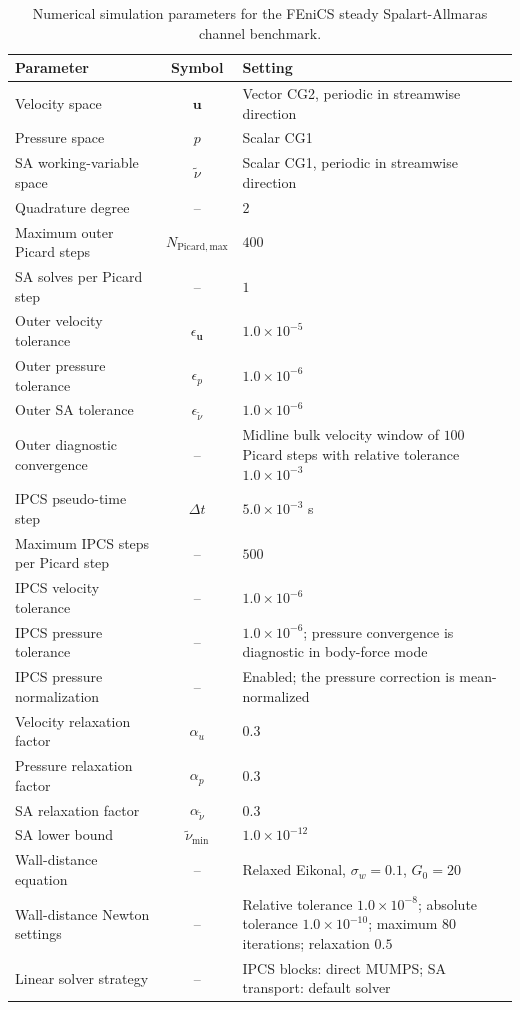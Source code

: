 \begin{table}[htbp]
	\centering
	\scriptsize
	\caption{Numerical simulation parameters for the FEniCS steady Spalart-Allmaras channel benchmark.}
	\label{tab:app_A_channel_numerical}
	\renewcommand{\arraystretch}{1.2}
	\begin{tabularx}{\textwidth}{l c X}
		\hline
		\textbf{Parameter} & \textbf{Symbol} & \textbf{Setting} \\
		\hline
		Velocity space & $\mathbf{u}$ & Vector CG2, periodic in streamwise direction \\
		Pressure space & $p$ & Scalar CG1 \\
		SA working-variable space & $\tilde{\nu}$ & Scalar CG1, periodic in streamwise direction \\
		Quadrature degree & -- & $2$ \\
			Maximum outer Picard steps & $N_{\mathrm{Picard,max}}$ & $400$ \\
			SA solves per Picard step & -- & $1$ \\
			Outer velocity tolerance & $\epsilon_{\mathbf{u}}$ & $1.0 \times 10^{-5}$ \\
			Outer pressure tolerance & $\epsilon_p$ & $1.0 \times 10^{-6}$ \\
			Outer SA tolerance & $\epsilon_{\tilde{\nu}}$ & $1.0 \times 10^{-6}$ \\
			Outer diagnostic convergence & -- & Midline bulk velocity window of $100$ Picard steps with relative tolerance $1.0\times10^{-3}$ \\
			IPCS pseudo-time step & $\Delta t$ & $5.0 \times 10^{-3}$ s \\
			Maximum IPCS steps per Picard step & -- & $500$ \\
			IPCS velocity tolerance & -- & $1.0 \times 10^{-6}$ \\
			IPCS pressure tolerance & -- & $1.0 \times 10^{-6}$; pressure convergence is diagnostic in body-force mode \\
			IPCS pressure normalization & -- & Enabled; the pressure correction is mean-normalized \\
		Velocity relaxation factor & $\alpha_u$ & $0.3$ \\
		Pressure relaxation factor & $\alpha_p$ & $0.3$ \\
		SA relaxation factor & $\alpha_{\tilde{\nu}}$ & $0.3$ \\
		SA lower bound & $\tilde{\nu}_{\min}$ & $1.0 \times 10^{-12}$ \\
		Wall-distance equation & -- & Relaxed Eikonal, $\sigma_w=0.1$, $G_0=20$ \\
		Wall-distance Newton settings & -- & Relative tolerance $1.0 \times 10^{-8}$; absolute tolerance $1.0 \times 10^{-10}$; maximum $80$ iterations; relaxation $0.5$ \\
		Linear solver strategy & -- & IPCS blocks: direct MUMPS; SA transport: default solver \\
		\hline
	\end{tabularx}
\end{table}

